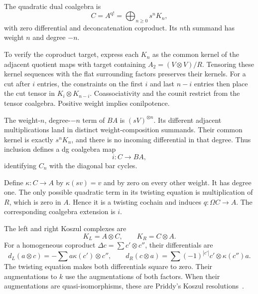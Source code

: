 The quadratic dual coalgebra is
\[
 C=A^{\mathrm{q!}}=\bigoplus_{n\geq0}s^nK_n,
\]
with zero differential and deconcatenation coproduct.
Its $n$th summand has weight $n$ and degree $-n$.

To verify the coproduct target, express each $K_n$ as the common kernel of the adjacent quotient maps with target containing $A_2=(V\otimes V)/R$.
Tensoring these kernel sequences with the flat surrounding factors preserves their kernels.
For a cut after $i$ entries, the constraints on the first $i$ and last $n-i$ entries then place the cut tensor in $K_i\otimes K_{n-i}$.
Coassociativity and the counit restrict from the tensor coalgebra.
Positive weight implies conilpotence.

The weight-$n$, degree-$-n$ term of $BA$ is $(sV)^{\otimes n}$.
Its different adjacent multiplications land in distinct weight-composition summands.
Their common kernel is exactly $s^nK_n$, and there is no incoming differential in that degree.
Thus inclusion defines a dg coalgebra map
\[
 i:C\longrightarrow BA,
\]
identifying $C_n$ with the diagonal bar cycles.

Define $\kappa:C\to A$ by $\kappa(sv)=v$ and by zero on every other weight.
It has degree one.
The only possible quadratic term in its twisting equation is multiplication of $R$, which is zero in $A$.
Hence it is a twisting cochain and induces $q:\Omega C\to A$.
The corresponding coalgebra extension is $i$.

The left and right Koszul complexes are
\[
 K_L=A\otimes C,\qquad K_R=C\otimes A.
\]
For a homogeneous coproduct $\Delta c=\sum c'\otimes c''$, their differentials are
\begin{equation}\label{eq:cbc:quadratic:twisted}
 d_L(a\otimes c)=-\sum a\kappa(c')\otimes c'',\qquad
 d_R(c\otimes a)=\sum(-1)^{|c'|}c'\otimes\kappa(c'')a.
\end{equation}
The twisting equation makes both differentials square to zero.
Their augmentations to $k$ use the augmentations of both factors.
When their augmentations are quasi-isomorphisms, these are Priddy's Koszul resolutions~\cite[Introduction]{Priddy}.

